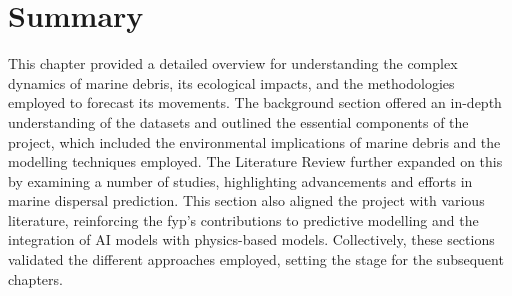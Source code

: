 \section{Summary}
\label{sec:2.3}

This chapter provided a detailed overview for understanding the complex dynamics of marine debris, its ecological impacts, and the methodologies employed to forecast its movements. The background section offered an in-depth understanding of the datasets and outlined the essential components of the project, which included the environmental implications of marine debris and the modelling techniques employed. The Literature Review further expanded on this by examining a number of studies, highlighting advancements and efforts in marine dispersal prediction. This section also aligned the project with various literature, reinforcing the \acrshort{fyp}’s contributions to predictive modelling and the integration of AI models with physics-based models. Collectively, these sections validated the different approaches employed, setting the stage for the subsequent chapters.